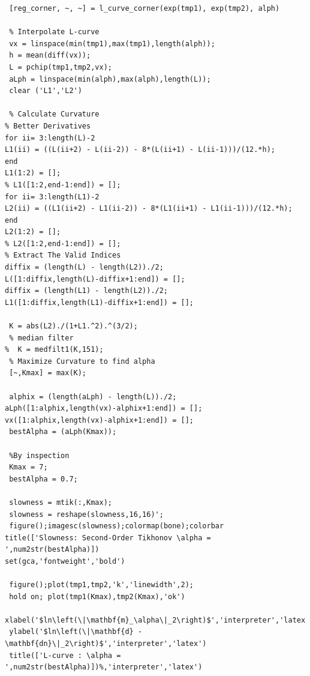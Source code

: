 \documentclass{article}
\begin{document}
\begin{verbatim}
 [reg_corner, ~, ~] = l_curve_corner(exp(tmp1), exp(tmp2), alph)
 
 % Interpolate L-curve
 vx = linspace(min(tmp1),max(tmp1),length(alph));
 h = mean(diff(vx));
 L = pchip(tmp1,tmp2,vx);
 aLph = linspace(min(alph),max(alph),length(L));
 clear ('L1','L2')

 % Calculate Curvature
% Better Derivatives
for ii= 3:length(L)-2
L1(ii) = ((L(ii+2) - L(ii-2)) - 8*(L(ii+1) - L(ii-1)))/(12.*h);
end
L1(1:2) = [];
% L1([1:2,end-1:end]) = [];
for ii= 3:length(L1)-2
L2(ii) = ((L1(ii+2) - L1(ii-2)) - 8*(L1(ii+1) - L1(ii-1)))/(12.*h);
end
L2(1:2) = [];
% L2([1:2,end-1:end]) = [];
% Extract The Valid Indices
diffix = (length(L) - length(L2))./2;
L([1:diffix,length(L)-diffix+1:end]) = [];
diffix = (length(L1) - length(L2))./2;
L1([1:diffix,length(L1)-diffix+1:end]) = [];

 K = abs(L2)./(1+L1.^2).^(3/2);
 % median filter
%  K = medfilt1(K,151);
 % Maximize Curvature to find alpha
 [~,Kmax] = max(K);
 
 alphix = (length(aLph) - length(L))./2;
aLph([1:alphix,length(vx)-alphix+1:end]) = [];
vx([1:alphix,length(vx)-alphix+1:end]) = [];
 bestAlpha = (aLph(Kmax));
 
 %By inspection
 Kmax = 7;
 bestAlpha = 0.7;
 
 slowness = mtik(:,Kmax);
 slowness = reshape(slowness,16,16)';
 figure();imagesc(slowness);colormap(bone);colorbar
title(['Slowness: Second-Order Tikhonov \alpha = ',num2str(bestAlpha)])
set(gca,'fontweight','bold')
 
 figure();plot(tmp1,tmp2,'k','linewidth',2);
 hold on; plot(tmp1(Kmax),tmp2(Kmax),'ok')
 xlabel('$ln\left(\|\mathbf{m}_\alpha\|_2\right)$','interpreter','latex')
 ylabel('$ln\left(\|\mathbf{d} - \mathbf{dn}\|_2\right)$','interpreter','latex')
 title(['L-curve : \alpha = ',num2str(bestAlpha)])%,'interpreter','latex')
\end{verbatim}
\end{document}
